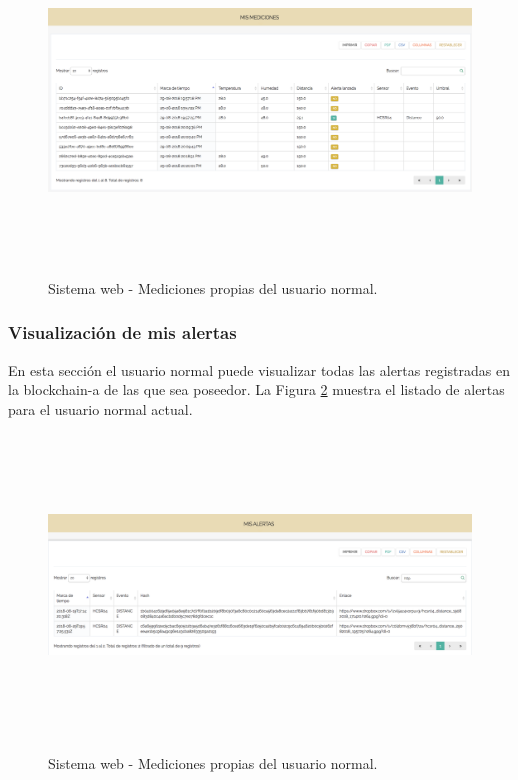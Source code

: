 \documentclass[12pt,a4paper, twoside]{report}
\begin{document}
	\begin{figure}[!ht]   
		\caption{Sistema web - Mediciones propias del usuario normal.} 
		\begin{center} 
			\includegraphics[width=18cm, height=8.5cm]{Images/userGuide/web/userMeasurements} \\
			\label{fig:web_userMeasurements} 
		\end{center}  	
	\end{figure}
	
	\subsubsection{Visualización de mis alertas}
	
	En esta sección el usuario normal puede visualizar todas las alertas registradas en la \gls{blockchain-a} de las que sea poseedor. La Figura \ref{fig:web_userAlerts} muestra el listado de alertas para el usuario normal actual.
	 
 	\begin{figure}[!ht]   
		\caption{Sistema web - Mediciones propias del usuario normal.} 
		\begin{center} 
			\includegraphics[width=18cm, height=8cm]{Images/userGuide/web/userAlerts} \\
			\label{fig:web_userAlerts} 
		\end{center}  	
	\end{figure}
 
\end{document}
